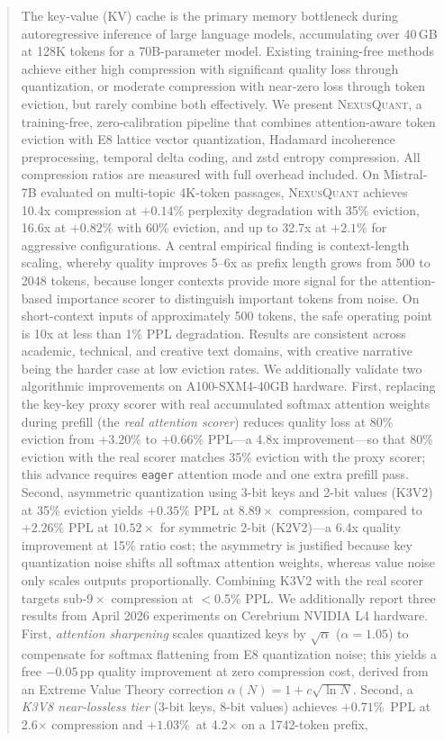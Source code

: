 
\begin{abstract}
The key-value (KV) cache is the primary memory bottleneck during autoregressive inference of large language models, accumulating over 40\,GB at 128K tokens for a 70B-parameter model. Existing training-free methods achieve either high compression with significant quality loss through quantization, or moderate compression with near-zero loss through token eviction, but rarely combine both effectively. We present \textsc{NexusQuant}, a training-free, zero-calibration pipeline that combines attention-aware token eviction with E8 lattice vector quantization, Hadamard incoherence preprocessing, temporal delta coding, and zstd entropy compression. All compression ratios are measured with full overhead included. On Mistral-7B evaluated on multi-topic 4K-token passages, \textsc{NexusQuant} achieves 10.4x compression at $+0.14\%$ perplexity degradation with 35\% eviction, 16.6x at $+0.82\%$ with 60\% eviction, and up to 32.7x at $+2.1\%$ for aggressive configurations. A central empirical finding is context-length scaling, whereby quality improves 5--6x as prefix length grows from 500 to 2048 tokens, because longer contexts provide more signal for the attention-based importance scorer to distinguish important tokens from noise. On short-context inputs of approximately 500 tokens, the safe operating point is 10x at less than 1\% PPL degradation. Results are consistent across academic, technical, and creative text domains, with creative narrative being the harder case at low eviction rates. We additionally validate two algorithmic improvements on A100-SXM4-40GB hardware. First, replacing the key-key proxy scorer with real accumulated softmax attention weights during prefill (the \emph{real attention scorer}) reduces quality loss at 80\% eviction from $+3.20\%$ to $+0.66\%$ PPL---a 4.8x improvement---so that 80\% eviction with the real scorer matches 35\% eviction with the proxy scorer; this advance requires \texttt{eager} attention mode and one extra prefill pass. Second, asymmetric quantization using 3-bit keys and 2-bit values (K3V2) at 35\% eviction yields $+0.35\%$ PPL at $8.89\times$ compression, compared to $+2.26\%$ PPL at $10.52\times$ for symmetric 2-bit (K2V2)---a 6.4x quality improvement at 15\% ratio cost; the asymmetry is justified because key quantization noise shifts all softmax attention weights, whereas value noise only scales outputs proportionally. Combining K3V2 with the real scorer targets sub-$9\times$ compression at $<$0.5\% PPL. We additionally report three results from April 2026 experiments on Cerebrium NVIDIA L4 hardware. First, \emph{attention sharpening} scales quantized keys by $\sqrt{\alpha}$ ($\alpha{=}1.05$) to compensate for softmax flattening from E8 quantization noise; this yields a free $-0.05$\,pp quality improvement at zero compression cost, derived from an Extreme Value Theory correction $\alpha(N) = 1 + c\sqrt{\ln N}$. Second, a \emph{K3V8 near-lossless tier} (3-bit keys, 8-bit values) achieves $+0.71$\%\ PPL at 2.6$\times$ compression and $+1.03$\%\ at 4.2$\times$ on a 1742-token prefix, 
\end{abstract}
